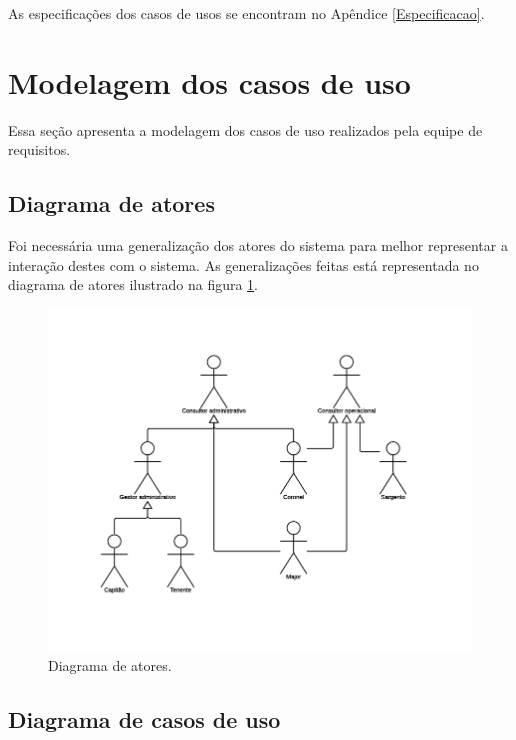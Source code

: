     As especificações dos casos de usos se encontram no Apêndice \ref{Especificacao}.
  
  \section{Modelagem dos casos de uso}
    
    Essa seção apresenta a modelagem dos casos de uso realizados pela equipe de requisitos.
    
    \subsection{Diagrama de atores}
    
      Foi necessária uma generalização dos atores do sistema para melhor representar a interação destes com o sistema. As generalizações
      feitas está representada no diagrama de atores ilustrado na figura \ref{diagrama_de_atores}.
      
      \begin{figure}[!htbp]
	\centering
	\includegraphics[scale=1]{figuras/diagrama_de_atores}
	\caption[Diagrama de atores]{Diagrama de atores.}
	\label{diagrama_de_atores}
      \end{figure}
    
    \vfill
    \pagebreak
    \subsection{Diagrama de casos de uso}
      
